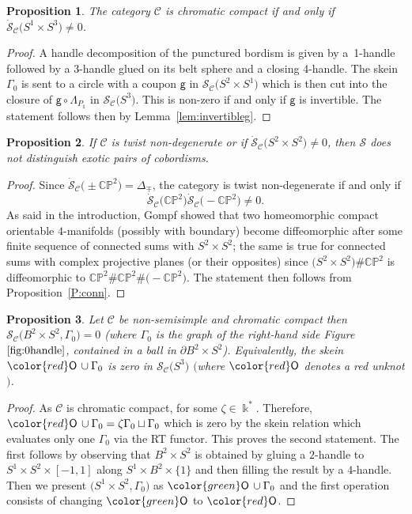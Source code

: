 \documentclass[10pt,a4paper]{amsart}
\newtheorem{proposition}{Proposition}
\numberwithin{equation}{section}
\newcommand{\gm}{{\mathsf{g}}}
\numberwithin{theorem}{section}
\numberwithin{proposition}{section}
\numberwithin{definition}{section}
\numberwithin{lemma}{section}
\numberwithin{corollary}{section}
\numberwithin{remark}{section}
\numberwithin{example}{section}
\newcommand{\cat}{\mathcal{C}}
\newcommand{\unit}{\ensuremath{\mathds{1}}}
\newcommand{\FK}{{\Bbbk}}
\newcommand{\CP}{\mathbb{CP}}
\newcommand{\TSkein}{{\mathscr{S}}}
\newcounter{exo} \newcounter{numexercice}
\begin{document}
\begin{proposition}
The category $\cat$ is chromatic compact if and only if $\dot\TSkein_\cat\bigl({S^1\times S^3}\bigr)\neq 0$.
\end{proposition}
\begin{proof}
 A handle decomposition of the punctured bordism
  is given by a~1-handle followed by a
 3-handle glued on its belt sphere and a closing 4-handle. The skein $\Gamma_0$ is sent to a circle with a coupon
 $\gm$ in $\TSkein_\cat\bigl(S^2\times S^1\bigr)$ which is then cut into the
 closure of $\gm \circ \Lambda_{P_\unit}$ in
 $\TSkein_\cat\bigl(S^3\bigr)$. This is non-zero if and only if $\gm$ is
 invertible. The statement follows then by Lemma~\ref{lem:invertibleg}.
\end{proof}
\begin{proposition}
 If $\cat$ is twist non-degenerate or if
 $\dot\TSkein_\cat\bigl(S^2\times S^2\bigr)\neq0$, then $\TSkein$ does not distinguish
 exotic pairs of cobordisms.
\end{proposition}
\begin{proof}
 Since $\dot\TSkein_\cat\bigl(\pm\CP^2\bigr)=\Delta_{\mp}$, the category is twist non-degenerate if and only if
 \[
 \dot\TSkein_\cat\bigl(\CP^2\bigr)\dot\TSkein_\cat\bigl(-\CP^2\bigr)\neq0.
 \]
 As
 said in the introduction, Gompf \cite{Go} showed that two
 homeomorphic compact orientable $4$-manifolds (possibly with
 boundary) become diffeomorphic after some finite sequence of
 connected sums with $S^2\times S^2$; the same is true for connected sums with complex projective planes (or their opposites) since $\bigl(S^2 \times S^2\bigr)\#\CP^2$ is diffeomorphic to $\CP^2\#\CP^2\#\bigl(-{\CP}^2\bigr)$.
The statement then follows from Proposition~\ref{P:conn}.
\end{proof}
\begin{proposition}
 Let $\cat$ be non-semisimple and chromatic compact then ${\TSkein_\cat\bigl(B^2\times S^2,\Gamma_0\bigr)=0}$ \big(where $\Gamma_0$ is the graph of the right-hand side Figure~$\ref{fig:0handle}$, contained in a ball in $\partial B^2\times S^2$\big).
Equivalently,
the
 skein ${\color{red}\mathsf O}\,\cup\Gamma_0$ is zero in
 $\TSkein_\cat\bigl(S^3\bigr)$ $($where ${\color{red}\mathsf O}$ denotes a red unknot$)$.
\end{proposition}
\begin{proof}
As $\cat$ is chromatic compact,
\smash{$\Delta_0^{P_\unit}=\zeta\Lambda_{P_{\unit}}$} for some $\zeta\in \FK^*$. Therefore, ${\color{red}\mathsf O}\,\cup\Gamma_0=\zeta \Gamma_0\sqcup \Gamma_0$ which is zero by the skein relation which evaluates only one $\Gamma_0$ via the RT functor. This proves the second statement. The first follows by observing that $B^2\times S^2$ is obtained by gluing a $2$-handle to $S^1\times S^2\times [-1,1]$ along $S^1\times B^2\times \{1\}$ and then filling the result by a $4$-handle. Then we present $\bigl(S^1\times S^2,\Gamma_0\bigr)$ as ${\color{green}\mathsf O}\,\cup\Gamma_0$ and the first operation consists of changing ${\color{green}\mathsf O}$ to ${\color{red}\mathsf O}$.
\end{proof}
\end{document}
